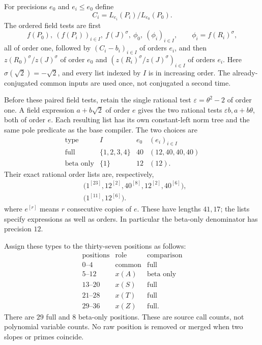 \documentclass[11pt]{article}
\theoremstyle{definition}
\theoremstyle{remark}
\begin{document}
For precisions $e_0$ and $e_i\le e_0$ define
\[
 C_i=L_{e_i}(P_i)/L_{e_0}(P_0).
\]
The ordered field tests are first
\[
 f(P_0),\ (f(P_i))_{i\in I},\ f(J)^\sigma,
 \ \phi_0,\ (\phi_i)_{i\in I},
 \qquad \phi_i=f(R_i)^\sigma,
\]
all of order one, followed by $(C_i-b_i)_{i\in I}$ of orders $e_i$,
and then $z(R_0)^\sigma/z(J)^\sigma$ of order $e_0$ and
$(z(R_i)^\sigma/z(J)^\sigma)_{i\in I}$ of orders $e_i$.
Here $\sigma(\sqrt2)=-\sqrt2$, and every list indexed by $I$ is in
increasing order. The already-conjugated common inputs are used once,
not conjugated a second time.

Before these paired field tests, retain the single rational test
$\varepsilon=\theta^2-2$ of order one. A field expression
$a+b\sqrt2$ of order $e$ gives the two rational tests
$\varepsilon b,a+b\theta$, both of order $e$.
Each resulting list has its own constant-left norm tree and the same
pole predicate as the base compiler. The two choices are
\[
\begin{array}{c|c|c|c}
 \text{type}&I&e_0&(e_i)_{i\in I}\\ \hline
 \text{full}&\{1,2,3,4\}&40&(12,40,40,40)\\
 \text{beta only}&\{1\}&12&(12).
\end{array}
\]
Their exact rational order lists are, respectively,
\begin{align*}
 &\bigl(1^{[23]},12^{[2]},40^{[8]},12^{[2]},40^{[6]}\bigr),\\
 &\bigl(1^{[11]},12^{[6]}\bigr).
\end{align*}
where $e^{[r]}$ means $r$ consecutive copies of $e$.
These have lengths $41,17$; the lists specify expressions as well as
orders. In particular the beta-only denominator has precision $12$.

Assign these types to the thirty-seven positions as follows:
\begin{equation}\label{eq:quartic-mode-partition}
\begin{array}{c|c|c}
 \text{positions}&\text{role}&\text{comparison}\\ \hline
 0\text{--}4&\text{common}&\text{full}\\
 5\text{--}12&x(A)&\text{beta only}\\
 13\text{--}20&x(S)&\text{full}\\
 21\text{--}28&x(T)&\text{full}\\
 29\text{--}36&x(Z)&\text{full}.
\end{array}
\end{equation}
There are $29$ full and $8$ beta-only positions. These are
source call counts, not polynomial variable counts. No raw position is
removed or merged when two slopes or primes coincide.
\end{document}
